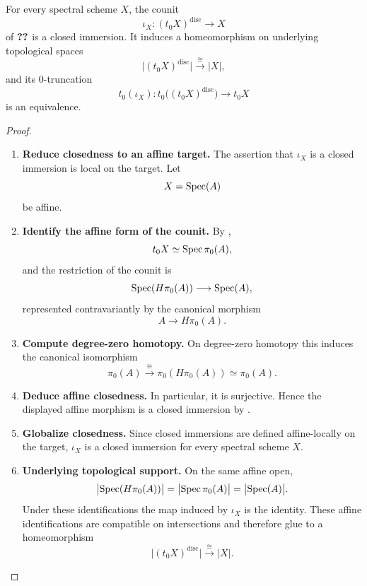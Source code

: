 \begin{corollary}
\label{cor:zero-truncation-counit-closed}
For every spectral scheme \(X\), the counit
\[
    \iota_X:
    (t_0X)^{\mathrm{disc}}
    \longrightarrow
    X
\]
of
\(\Ref{thm:global-zero-truncated-reconstruction}\)
is a closed immersion. It induces a homeomorphism on underlying topological
spaces
\[
    \bigl|(t_0X)^{\mathrm{disc}}\bigr|
    \xrightarrow{\ \cong\ }
    |X|,
\]
and its \(0\)-truncation
\[
    t_0(\iota_X):
    t_0\bigl((t_0X)^{\mathrm{disc}}\bigr)
    \longrightarrow
    t_0X
\]
is an equivalence.
\end{corollary}

\begin{proof}
\leavevmode
\begin{enumerate}[label=\textup{(\arabic*)}]
    \item \textbf{Reduce closedness to an affine target.}
    The assertion that \(\iota_X\) is a closed immersion is local on the
    target. Let
    \[
        X=\operatorname{Spec}(A)
    \]
    be affine.

    \item \textbf{Identify the affine form of the counit.}
    By
    ,
    \[
        t_0X\simeq\operatorname{Spec}\pi_0(A),
    \]
    and the restriction of the counit is
    \[
        \operatorname{Spec}(H\pi_0(A))
        \longrightarrow
        \operatorname{Spec}(A),
    \]
    represented contravariantly by the canonical morphism
    \[
        A\longrightarrow H\pi_0(A).
    \]

    \item \textbf{Compute degree-zero homotopy.}
    On degree-zero homotopy this induces the canonical isomorphism
    \[
        \pi_0(A)
        \xrightarrow{\ \cong\ }
        \pi_0(H\pi_0(A))
        \simeq
        \pi_0(A).
    \]

    \item \textbf{Deduce affine closedness.}
    In particular, it is surjective. Hence the displayed affine morphism is
    a closed immersion by
    .

    \item \textbf{Globalize closedness.}
    Since closed immersions are
    defined affine-locally on the target, \(\iota_X\) is a closed immersion
    for every spectral scheme \(X\).

    \item \textbf{Underlying topological support.}
    On the same affine open,
    \[
        \bigl|\operatorname{Spec}(H\pi_0(A))\bigr|
        =
        \bigl|\operatorname{Spec}\pi_0(A)\bigr|
        =
        \bigl|\operatorname{Spec}(A)\bigr|.
    \]
    Under these identifications the map induced by \(\iota_X\) is the
    identity. These affine identifications are compatible on intersections
    and therefore glue to a homeomorphism
    \[
        \bigl|(t_0X)^{\mathrm{disc}}\bigr|
        \xrightarrow{\ \cong\ }
        |X|.
    \]


\end{enumerate}
\end{proof}
